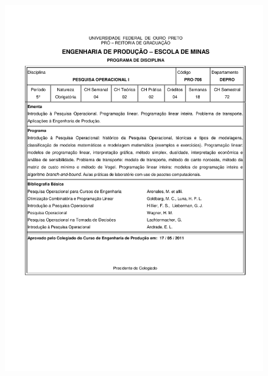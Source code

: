 \begin{figure}[p]
	\centering 
	\includegraphics[scale=0.7]{capitulos/anexo1-programas-disciplina/eg321.pdf}
\end{figure}
